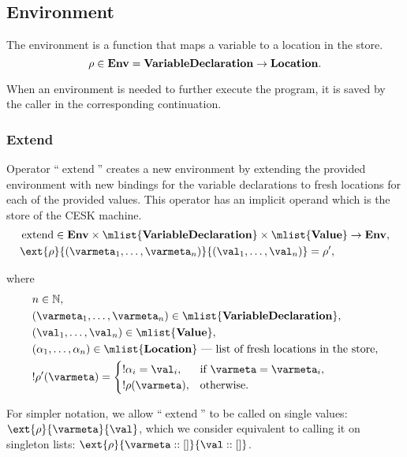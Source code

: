 \documentclass[a4paper,oneside,fleqn]{article}
\newcommand{\NN}{\mathbb{N}}    %
\DeclareMathOperator{\extend}{extend}
\newcommand{\denv}{\mathbf{Env}}
\newcommand{\dval}{\mathbf{Value}}
\newcommand{\dvardecl}{\mathbf{VariableDeclaration}}
\begin{document}
\subsection{Environment}
\label{subsec:env-definition}

The environment is a function that maps a variable to a location in the store.
\[
    \env \in \denv = \dvardecl \rightarrow \dlocation.
\]

When an environment is needed to further execute the program, it is saved by the caller in the corresponding continuation.


\subsubsection{Extend}
\label{subsubsec:extend-env}

Operator ``$\extend$'' creates a new environment by extending the provided environment with new bindings for the variable declarations to fresh locations for each of the provided values.
This operator has an implicit operand which is the store of the CESK machine.
\begin{align*}
    &\extend \in \denv \times \mlist{\dvardecl} \times \mlist{\dval} \rightarrow  \denv,\\
    &\ext{\env}{(\varmeta_{1}, \dots, \varmeta_{n})}{(\val_{1}, \dots, \val_{n})} = \env',
\end{align*}

\noindent where
\begin{align*}
    & n \in \NN,\\
    & (\varmeta_{1}, \dots, \varmeta_{n}) \in \mlist{\dvardecl},\\
    & (\val_{1}, \dots, \val_{n}) \in \mlist{\dval},\\
    & (\alpha_{1}, \dots, \alpha_{n}) \in \mlist{\dlocation} \text{ --- list of fresh locations in the store},\\
    & !\env'(\varmeta) =\begin{cases}
        !\loc_i = \val_i, & \text{if }\varmeta = \varmeta_i,\\
        !\env(\varmeta), &\text{otherwise}.
    \end{cases}
\end{align*}

For simpler notation, we allow ``$\extend$'' to be called on single values: $\ext{\env}{\varmeta}{\val}$, which we consider equivalent to calling it on singleton lists: $\ext{\env}{\varmeta :: []}{\val :: []}$.
\end{document}
